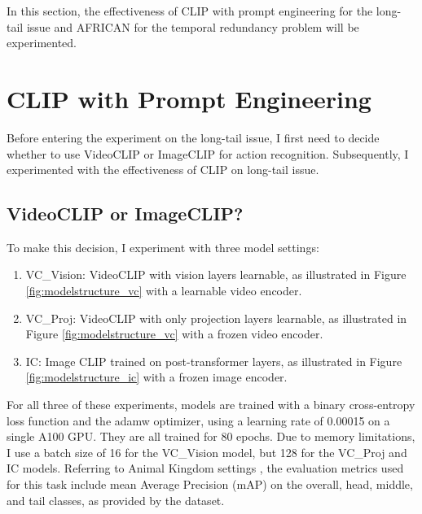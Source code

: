 In this section, the effectiveness of CLIP with prompt engineering for the long-tail issue and AFRICAN for the temporal redundancy problem will be experimented.

\section{CLIP with Prompt Engineering}
Before entering the experiment on the long-tail issue, I first need to decide whether to use VideoCLIP or ImageCLIP for action recognition. Subsequently, I experimented with the effectiveness of CLIP on long-tail issue.

\subsection{VideoCLIP or ImageCLIP?}
\label{sec:imageclipbetter}
 To make this decision, I experiment with three model settings: 

\begin{enumerate}
    \item VC\_Vision: VideoCLIP with vision layers learnable, as illustrated in Figure \ref{fig:modelstructure_vc} with a learnable video encoder.
    \item VC\_Proj: VideoCLIP with only projection layers learnable, as illustrated in Figure \ref{fig:modelstructure_vc} with a frozen video encoder.
    \item IC: Image CLIP trained on post-transformer layers, as illustrated in Figure \ref{fig:modelstructure_ic} with a frozen image encoder.
\end{enumerate}

For all three of these experiments, models are trained with a binary cross-entropy loss function and the adamw optimizer, using a learning rate of 0.00015 on a single A100 GPU. They are all trained for 80 epochs. Due to memory limitations, I use a batch size of 16 for the VC\_Vision model, but 128 for the VC\_Proj and IC models. Referring to Animal Kingdom settings \parencite{ng2022animal}, the evaluation metrics used for this task include mean Average Precision (mAP) on the overall, head, middle, and tail classes, as provided by the dataset. 


